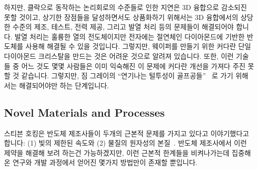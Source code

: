 \iffalse
Perhaps the most important benefit of 3DI is decreased path length through
the system, as shown in
Figure~\ref{fig:cpu:Latency Benefit of 3D Integration}.
A 3-centimeter silicon die is replaced with a stack of four 1.5-centimeter
dies, in theory decreasing the maximum path through the system by a factor
of two, keeping in mind that each layer is quite thin.
In addition, given proper attention to design and placement,
long horizontal electrical connections (which are both slow and
power hungry) can be replaced by short vertical electrical connections,
which are both faster and more power efficient.
\fi

하지만, 클락으로 동작하는 논리회로의 수준들로 인한 지연은 3D 융합으로 감소되진
못할 것이고, 상기한 장점들을 달성하면서도 상품화하기 위해서는 3D 융합에서의
상당한 수준의 제조, 테스트, 전력 제공, 그리고 발열 처리 등의 문제들이
해결되어야 합니다.
발열 처리는 훌륭한 열의 전도체이지만 전자에는 절연체인 다이아몬드에 기반한
반도체를 사용해 해결될 수 있을 것입니다.
그렇지만, 웨이퍼를 만들기 위한 커다란 단일 다이아몬드 크리스탈을 만드는 것은
어려운 것으로 알려져 있습니다.
또한, 이런 기술들 중 어느 것도 몇몇 사람들은 이미 익숙해진 이 문제에 커다란
개선을 가져다 주진 못할 것 같습니다.
그렇지만, 짐 그레이의 ``연기나는 털투성이
골프공들''~\cite{JimGray2002SmokingHairyGolfBalls} 로 가기 위해서는
해결되어야만 하는 단계입니다.

\iffalse
However, delays due to levels of clocked logic will not be decreased
by 3D integration, and significant manufacturing, testing, power-supply,
and heat-dissipation problems must be solved for 3D integration to
reach production while still delivering on its promise.
The heat-dissipation problems might be solved using
semiconductors based on diamond, which is a good conductor
for heat, but an electrical insulator.
That said, it remains difficult to grow large single diamond crystals,
to say nothing of slicing them into wafers.
In addition, it seems unlikely that any of these technologies will be able to
deliver the exponential increases to which some people have become accustomed.
That said, they may be necessary steps on the path to the late Jim Gray's
``smoking hairy golf balls''~\cite{JimGray2002SmokingHairyGolfBalls}.
\fi

\subsection{Novel Materials and Processes}
\label{sec:cpu:Novel Materials and Processes}

스티븐 호킹은 반도체 제조사들이 두개의 근본적 문제를 가지고 있다고 이야기했다고
합니다: (1) 빛의 제한된 속도와 (2) 물질의 원자성의
본질~\cite{BryanGardiner2007}.
반도체 제조사에서 이런 제약을 해결해 보려 하는건 가능하겠지만, 이런 근본적
한계들을 비켜나가는데 집중해온 연구와 개발 과정에서 얻어진 몇가지 방법만이
존재할 뿐입니다.

